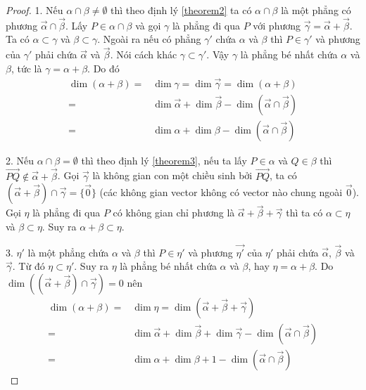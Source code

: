 \begin{proof}
	1. Nếu $\alpha \cap \beta \neq \emptyset$ thì theo định lý \ref{theorem2} ta có $\alpha \cap \beta$ là một phẳng có phương $\overrightarrow{\alpha} \cap \overrightarrow{\beta}$. Lấy $P \in \alpha \cap \beta$ và gọi $\gamma$ là phẳng đi qua $P$ với phương $\overrightarrow{\gamma} = \overrightarrow{\alpha} + \overrightarrow{\beta}$. Ta có $\alpha \subset \gamma$ và $\beta \subset \gamma$. Ngoài ra nếu có phẳng $\gamma'$ chứa $\alpha$ và $\beta$ thì $P \in \gamma'$ và phương của $\gamma'$ phải chứa $\overrightarrow{\alpha}$ và $\overrightarrow{\beta}$. Nói cách khác $\gamma \subset \gamma'$. Vậy $\gamma$ là phẳng bé nhất chứa $\alpha$ và $\beta$, tức là $\gamma = \alpha + \beta$. Do đó 
    \begin{align*}
        \dim(\alpha + \beta) = & \dim\gamma = \dim\overrightarrow{\gamma} = \dim(\alpha + \beta) \\ 
        = & \dim\overrightarrow{\alpha} + \dim\overrightarrow{\beta} - \dim(\overrightarrow{\alpha} \cap \overrightarrow{\beta}) \\ 
        = & \dim\alpha + \dim\beta - \dim(\overrightarrow{\alpha} \cap \overrightarrow{\beta})
    \end{align*}
	
    2. Nếu $\alpha \cap \beta = \emptyset$ thì theo định lý \ref{theorem3}, nếu ta lấy $P \in \alpha$ và $Q \in \beta$ thì $\overrightarrow{PQ} \not\in \overrightarrow{\alpha} + \overrightarrow{\beta}$. Gọi $\overrightarrow{\gamma}$ là không gian con một chiều sinh bởi $\overrightarrow{PQ}$, ta có $(\overrightarrow{\alpha} + \overrightarrow{\beta}) \cap \overrightarrow{\gamma} = \{ \overrightarrow{0} \}$ (các không gian vector không có vector nào chung ngoài $\overrightarrow{0}$). Gọi $\eta$ là phẳng đi qua $P$ có không gian chỉ phương là $\overrightarrow{\alpha} + \overrightarrow{\beta} + \overrightarrow{\gamma}$ thì ta có $\alpha \subset \eta$ và $\beta \subset \eta$. Suy ra $\alpha + \beta \subset \eta$.
		
	3. $\eta'$ là một phẳng chứa $\alpha$ và $\beta$ thì $P \in \eta'$ và phương $\overrightarrow{\eta'}$ của $\eta'$ phải chứa $\overrightarrow{\alpha}$, $\overrightarrow{\beta}$ và $\overrightarrow{\gamma}$. Từ đó $\eta \subset \eta'$. Suy ra $\eta$ là phẳng bé nhất chứa $\alpha$ và $\beta$, hay $\eta = \alpha + \beta$. Do $\dim((\overrightarrow{\alpha} + \overrightarrow{\beta}) \cap \overrightarrow{\gamma}) = 0$ nên
    \begin{align*}
        \dim(\alpha + \beta) = & \dim\eta = \dim(\overrightarrow{\alpha} + \overrightarrow{\beta} + \overrightarrow{\gamma}) \\ 
        = & \dim\overrightarrow{\alpha} + \dim\overrightarrow{\beta} + \dim\overrightarrow{\gamma} - \dim(\overrightarrow{\alpha} \cap \overrightarrow{\beta}) \\ 
        = & \dim\alpha + \dim\beta + 1 - \dim(\overrightarrow{\alpha} \cap \overrightarrow{\beta})
    \end{align*}
\end{proof}

